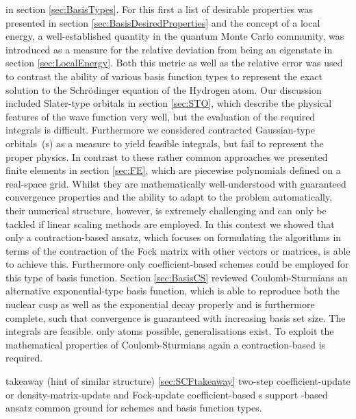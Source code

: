 in section \vref{sec:BasisTypes}.
For this first a list of desirable properties
was presented in section \vref{sec:BasisDesiredProperties}
and the concept of a local energy,
a well-established quantity in the quantum Monte Carlo community,
was introduced as a measure for the relative deviation from being an eigenstate
in section \vref{sec:LocalEnergy}.
Both this metric as well as the relative error
was used to contrast the ability of various basis function types
to represent the exact solution to the Schrödinger equation of the Hydrogen atom.
Our discussion included
Slater-type orbitals in section \vref{sec:STO},
which describe the physical features of the wave function very well,
but the evaluation of the required integrals is difficult.
Furthermore we considered contracted Gaussian-type orbitals~({\cGTO}s)
as a measure to yield feasible integrals,
but fail to represent the proper physics.
In contrast to these rather common approaches we presented
finite elements in section \vref{sec:FE},
which are piecewise polynomials defined on a real-space grid.
Whilst they are mathematically well-understood
with guaranteed convergence properties
and the ability to adapt to the problem automatically,
their numerical structure, however, is extremely challenging
and can only be tackled if linear scaling methods are employed.
In this context we showed that only a contraction-based ansatz,
which focuses on formulating the algorithms
in terms of the contraction of the Fock matrix with other
vectors or matrices,
is able to achieve this.
Furthermore only coefficient-based \SCF schemes could be employed
for this type of basis function.
Section \vref{sec:BasisCS} reviewed Coulomb-Sturmians
an alternative exponential-type basis function,
which is able to reproduce both the nuclear cusp as well as the exponential
decay properly
and is furthermore complete,
such that convergence is guaranteed
with increasing basis set size.
The integrals are feasible.
only atoms possible, generalisations exist.
To exploit the mathematical properties of Coulomb-Sturmians
again a contraction-based \SCF is required.








\SCF takeaway (hint of similar structure) \vref{sec:SCFtakeaway}
two-step coefficient-update or density-matrix-update and Fock-update
coefficient-based {\SCF}s support \contraction-based ansatz
common ground for \SCF schemes and basis function types.



